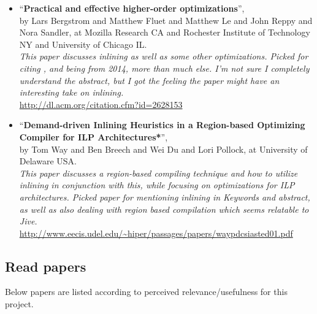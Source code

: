 \begin{itemize}
	\item ``\textbf{Practical and effective higher-order optimizations}'', \\ by
Lars Bergstrom and Matthew Fluet and Matthew Le and John Reppy and Nora Sandler,
at Mozilla Research CA and Rochester Institute of Technology NY and University
of Chicago IL. \\
\textit{This paper discusses inlining as well as some other optimizations.
Picked for citing \cite{GHC-paper}, and being from 2014, more than much else.
I'm not sure I completely understand the abstract, but I got the feeling the
paper might have an interesting take on inlining.} \\
\url{http://dl.acm.org/citation.cfm?id=2628153}

	\item ``\textbf{Demand-driven Inlining Heuristics in a Region-based
Optimizing Compiler for ILP Architectures*}'', \\ by Tom Way and Ben Breech and
Wei Du and Lori Pollock, at University of Delaware USA. \\
\textit{This paper discusses a region-based compiling technique and how to
utilize inlining in conjunction with this, while focusing on optimizations for
ILP architectures. Picked paper for mentioning inlining in Keywords and
abstract, as well as also dealing with region based compilation which seems
relatable to Jive.} \\
\url{http://www.eecis.udel.edu/~hiper/passages/papers/waypdcsiasted01.pdf}

\end{itemize}

\subsection{Read papers}

Below papers are listed according to perceived relevance/usefulness for this
project.\\

